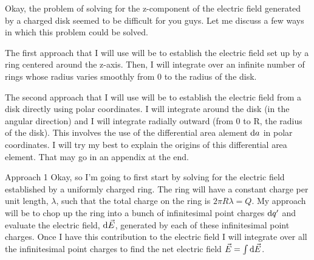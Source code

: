 \begin{homeworkProblem} 
    Okay, the problem of solving for the z-component of the electric
    field generated by a charged disk seemed to be difficult for you
    guys. Let me discuss a few ways in which this problem could be
    solved.
    
    The first approach that I will use will be to establish the
    electric field set up by a ring centered around the z-axis. Then, I
    will integrate over an infinite number of rings whose radius varies
    smoothly from 0 to the radius of the disk.

    The second approach that I will use will be to establish the
    electric field from a disk directly using polar coordinates. I will
    integrate around the disk (in the angular direction) and I will
    integrate radially outward (from 0 to R, the radius of the disk).
    This involves the use of the differential area alement $\mathop{}\!\mathrm{d} a$ in
    polar coordinates. I will try my best to explain the origins of this
    differential area element. That may go in an appendix at the end.

    \begin{homeworkSection}{Approach 1}
        Okay, so I'm going to first start by solving for the electric
        field established by a uniformly charged ring. The ring will
        have a constant charge per unit length, $\lambda$, such that the
        total charge on the ring is $2\pi R \lambda = Q$. My approach
        will be to chop up the ring into a bunch of infinitesimal point
        charges $\mathop{}\!\mathrm{d} q'$ and evaluate the electric field, $\mathop{}\!\mathrm{d} \vec{E}$,
        generated by each of these infinitesimal point charges. Once I
        have this contribution to the electric field I will integrate
        over all the infinitesimal point charges to find the net
        electric field $\vec{E} = \int \mathop{}\!\mathrm{d} \vec{E}$. 


\end{homeworkSection}
\end{homeworkProblem}
